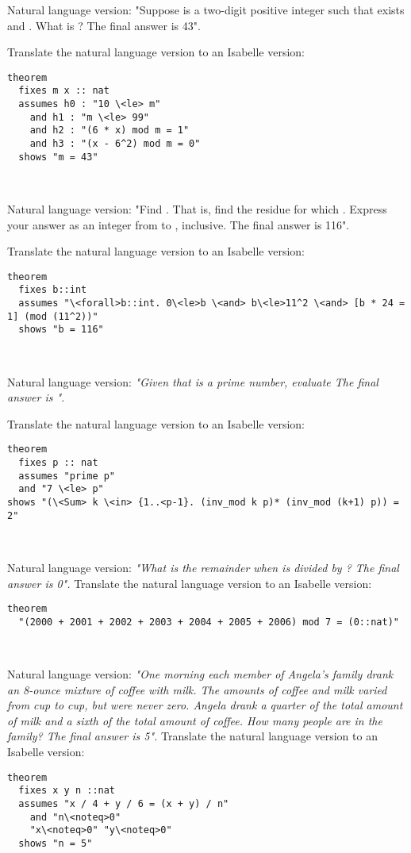 \documentclass{article}
\begin{document}
\begin{boxB}
Natural language version: "Suppose  is a two-digit positive integer such that  exists and . What is ? The final answer is 43".

Translate the natural language version to an Isabelle version:
\begin{lstlisting}
theorem
  fixes m x :: nat
  assumes h0 : "10 \<le> m"
    and h1 : "m \<le> 99"
    and h2 : "(6 * x) mod m = 1"
    and h3 : "(x - 6^2) mod m = 0"
  shows "m = 43"
\end{lstlisting}

\ 

Natural language version: "Find . That is, find the residue  for which .
Express your answer as an integer from  to , inclusive. The final answer is 116".

Translate the natural language version to an Isabelle version:
\begin{lstlisting}
theorem
  fixes b::int
  assumes "\<forall>b::int. 0\<le>b \<and> b\<le>11^2 \<and> [b * 24 = 1] (mod (11^2))"
  shows "b = 116"
\end{lstlisting}

\

Natural language version: \emph{"Given that  is a prime number, evaluate  The final answer is ".}

Translate the natural language version to an Isabelle version:

\begin{lstlisting}
theorem
  fixes p :: nat
  assumes "prime p"
  and "7 \<le> p" 
shows "(\<Sum> k \<in> {1..<p-1}. (inv_mod k p)* (inv_mod (k+1) p)) = 2"
\end{lstlisting}
\

Natural language version: \emph{"What is the remainder when  is divided by ? The final answer is 0".}
Translate the natural language version to an Isabelle version:
\begin{lstlisting}
theorem
  "(2000 + 2001 + 2002 + 2003 + 2004 + 2005 + 2006) mod 7 = (0::nat)"
\end{lstlisting}

\

Natural language version: \emph{"One morning each member of Angela's family drank an 8-ounce mixture of coffee with milk. The amounts of coffee and milk varied from cup to cup, but were never zero. Angela drank a quarter of the total amount of milk and a sixth of the total amount of coffee. How many people are in the family? The final answer is 5".}
Translate the natural language version to an Isabelle version:
\begin{lstlisting}
theorem
  fixes x y n ::nat
  assumes "x / 4 + y / 6 = (x + y) / n"
    and "n\<noteq>0"
    "x\<noteq>0" "y\<noteq>0"
  shows "n = 5"
\end{lstlisting}

\end{boxB}
\end{document}
